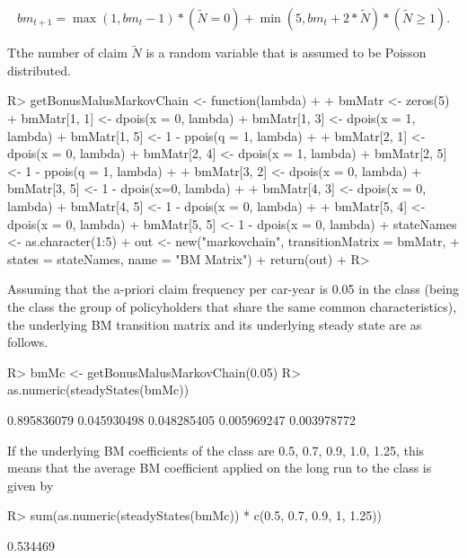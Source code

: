 \documentclass[nojss]{jss}
\begin{document}
\begin{equation}
bm_{t + 1} = \max \left( {1,bm_{t} - 1} \right)*\left( {\tilde N = 0} \right) + \min \left( {5,bm_{t} + 2*\tilde N} \right)*\left( {\tilde N \ge 1} \right).
\label{eq:BM}
\end{equation}

Tthe number of claim $\tilde N$  is a random variable that is assumed
to be Poisson distributed.

\begin{Schunk}
\begin{Sinput}
R> getBonusMalusMarkovChain <- function(lambda)
+  {
+  	bmMatr <- zeros(5)
+  	bmMatr[1, 1] <- dpois(x = 0, lambda)
+  	bmMatr[1, 3] <- dpois(x = 1, lambda)
+  	bmMatr[1, 5] <- 1 - ppois(q = 1, lambda)
+  	
+  	bmMatr[2, 1] <- dpois(x = 0, lambda)
+  	bmMatr[2, 4] <- dpois(x = 1, lambda)
+  	bmMatr[2, 5] <- 1 - ppois(q = 1, lambda)
+  	
+  	bmMatr[3, 2] <- dpois(x = 0, lambda)
+  	bmMatr[3, 5] <- 1 - dpois(x=0, lambda)
+   
+  	bmMatr[4, 3] <- dpois(x = 0, lambda)
+  	bmMatr[4, 5] <- 1 - dpois(x = 0, lambda)
+    
+  	bmMatr[5, 4] <- dpois(x = 0, lambda)
+  	bmMatr[5, 5] <- 1 - dpois(x = 0, lambda)
+  	stateNames <- as.character(1:5)
+  	out <- new("markovchain", transitionMatrix = bmMatr, 
+               states = stateNames, name = "BM Matrix")
+  	return(out)
+  }
R> 
\end{Sinput}
\end{Schunk}

Assuming that the a-priori claim frequency per car-year is 0.05 in the class (being the class the group of policyholders that share the same common characteristics), the underlying BM transition matrix and its underlying steady state are as follows.

\begin{Schunk}
\begin{Sinput}
R> bmMc <- getBonusMalusMarkovChain(0.05)
R> as.numeric(steadyStates(bmMc))
\end{Sinput}
\begin{Soutput}
[1] 0.895836079 0.045930498 0.048285405 0.005969247 0.003978772
\end{Soutput}
\end{Schunk}

If the underlying BM coefficients of the class are 0.5, 0.7, 0.9, 1.0, 1.25, this
means that the average BM coefficient applied on the long run to the class is given by

\begin{Schunk}
\begin{Sinput}
R> sum(as.numeric(steadyStates(bmMc)) * c(0.5, 0.7, 0.9, 1, 1.25))
\end{Sinput}
\begin{Soutput}
[1] 0.534469
\end{Soutput}
\end{Schunk}
\end{document}
